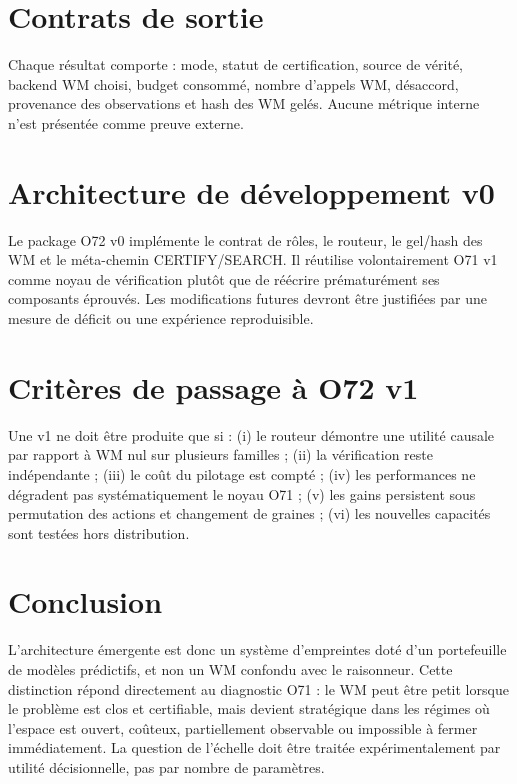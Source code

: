 \documentclass[11pt,a4paper]{article}
\begin{document}
\section{Contrats de sortie}
Chaque résultat comporte : mode, statut de certification, source de vérité, backend WM choisi, budget consommé, nombre d'appels WM, désaccord, provenance des observations et hash des WM gelés. Aucune métrique interne n'est présentée comme preuve externe.
\section{Architecture de développement v0}
Le package O72 v0 implémente le contrat de rôles, le routeur, le gel/hash des WM et le méta-chemin CERTIFY/SEARCH. Il réutilise volontairement O71 v1 comme noyau de vérification plutôt que de réécrire prématurément ses composants éprouvés. Les modifications futures devront être justifiées par une mesure de déficit ou une expérience reproduisible.
\section{Critères de passage à O72 v1}
Une v1 ne doit être produite que si : (i) le routeur démontre une utilité causale par rapport à WM nul sur plusieurs familles ; (ii) la vérification reste indépendante ; (iii) le coût du pilotage est compté ; (iv) les performances ne dégradent pas systématiquement le noyau O71 ; (v) les gains persistent sous permutation des actions et changement de graines ; (vi) les nouvelles capacités sont testées hors distribution.
\section{Conclusion}
L'architecture émergente est donc un système d'empreintes doté d'un portefeuille de modèles prédictifs, et non un WM confondu avec le raisonneur. Cette distinction répond directement au diagnostic O71 : le WM peut être petit lorsque le problème est clos et certifiable, mais devient stratégique dans les régimes où l'espace est ouvert, coûteux, partiellement observable ou impossible à fermer immédiatement. La question de l'échelle doit être traitée expérimentalement par utilité décisionnelle, pas par nombre de paramètres.
\end{document}
